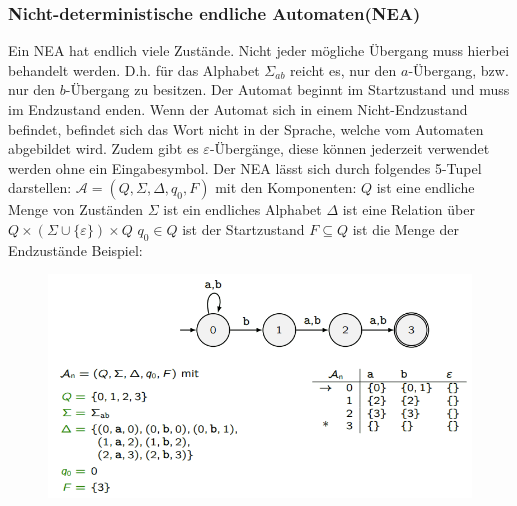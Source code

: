 \documentclass[12pt,a4paper]{article}
\begin{document}
\subsubsection{Nicht-deterministische endliche Automaten(NEA)}
Ein NEA hat endlich viele Zustände. Nicht jeder mögliche Übergang muss hierbei behandelt werden. D.h. für das Alphabet $\varSigma_{ab}$ reicht es, nur den $a$-Übergang, bzw. nur den $b$-Übergang zu besitzen. Der Automat beginnt im Startzustand und muss im Endzustand enden. Wenn der Automat sich in einem Nicht-Endzustand befindet, befindet sich das Wort nicht in der Sprache, welche vom Automaten abgebildet wird. Zudem gibt es $\varepsilon$-Übergänge, diese können jederzeit verwendet werden ohne ein Eingabesymbol.\newline
\noindent Der NEA lässt sich durch folgendes 5-Tupel darstellen:\newline
$\mathcal{A} = (Q, \varSigma, \Delta , q_0, F)$ mit den Komponenten:\newline
$Q$ ist eine endliche Menge von Zuständen\newline
$\varSigma$ ist ein endliches Alphabet\newline
$\Delta$ ist eine Relation über $Q \times (\varSigma \cup \{\varepsilon\}) \times Q$\newline
$q_0 \in Q$ ist der Startzustand\newline
$F \subseteq Q$ ist die Menge der Endzustände\newline
\newline
Beispiel:\newline
\begin{center}
	\begin{figure}[!h]
		\includegraphics[width=\textwidth]{Bilder/NEA_Beispiel.png}
	\end{figure}
\end{center}
\end{document}
